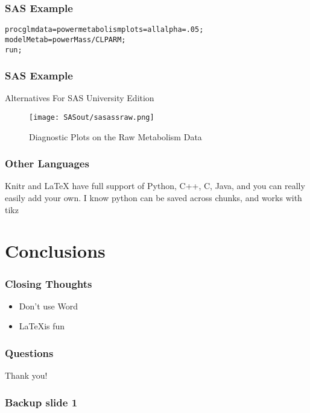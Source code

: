 \documentclass{beamer}\usepackage[]{graphicx}\usepackage[]{color}
\makeatletter
\newenvironment{kframe}{%
 \def\at@end@of@kframe{}%
 \ifinner\ifhmode%
  \def\at@end@of@kframe{\end{minipage}}%
  \begin{minipage}{\columnwidth}%
 \fi\fi%
 \def\FrameCommand##1{\hskip\@totalleftmargin \hskip-\fboxsep
 \colorbox{shadecolor}{##1}\hskip-\fboxsep
     \hskip-\linewidth \hskip-\@totalleftmargin \hskip\columnwidth}%
 \MakeFramed {\advance\hsize-\width
   \@totalleftmargin\z@ \linewidth\hsize
   \@setminipage}}%
 {\par\unskip\endMakeFramed%
 \at@end@of@kframe}
\newenvironment{knitrout}{}{} %
\makeatother
\begin{document}
\begin{frame}
\frametitle{SAS Example}
\begin{knitrout}
\color{fgcolor}\begin{kframe}
\begin{alltt}
proc glm data=powermetabolism plots=all alpha=.05;
model Metab=powerMass / CLPARM;
run;
\end{alltt}
\end{kframe}
\end{knitrout}
\end{frame}
\begin{frame}
\frametitle{SAS Example}
 Alternatives For SAS University Edition
\begin{figure}[H]
	\label{fig:SASdiagraw}
	\begin{center}
		\texttt{[image: SASout/sasassraw.png]}
	\end{center}
\caption{Diagnostic Plots on the Raw Metabolism Data}
\end{figure}
\end{frame}
\begin{frame}
\frametitle{Other Languages}
Knitr and LaTeX have full support of Python, C++, C, Java, and you can really easily add your own. I know python can be saved across chunks, and works with tikz
\end{frame}
	\section{Conclusions}
		\begin{frame}
			\frametitle{Closing Thoughts}
			\begin{itemize}[<+->]
				\item Don't use Word
				\item \LaTeX is fun
			\end{itemize}
		\end{frame}
\begin{frame}
\frametitle{Questions}
Thank you! 
\end{frame}
	\appendix
	\backupbegin
	  \begin{frame}
	    \frametitle{Backup slide 1}
	    \blindtext
	  \end{frame}
	\backupend
\end{document}
